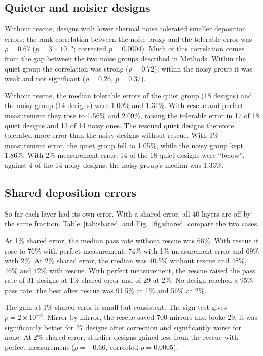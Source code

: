 \subsection{Quieter and noisier designs}

Without rescue, designs with lower thermal noise tolerated smaller deposition errors: the rank correlation between the noise proxy and the tolerable error was $\rho = 0.67$ ($p = 3\times10^{-5}$; corrected $p = 0.0004$). Much of this correlation comes from the gap between the two noise groups described in Methods. Within the quiet group the correlation was strong ($\rho = 0.72$); within the noisy group it was weak and not significant ($\rho = 0.26$, $p = 0.37$).

Without rescue, the median tolerable errors of the quiet group (18 designs) and the noisy group (14 designs) were 1.00\% and 1.31\%. With rescue and perfect measurement they rose to 1.56\% and 2.09\%, raising the tolerable error in 17 of 18 quiet designs and 13 of 14 noisy ones. The rescued quiet designs therefore tolerated more error than the noisy designs without rescue. With 1\% measurement error, the quiet group fell to 1.05\%, while the noisy group kept 1.86\%. With 2\% measurement error, 14 of the 18 quiet designs were ``below'', against 4 of the 14 noisy designs; the noisy group's median was 1.33\%.

\subsection{Shared deposition errors}

So far each layer had its own error. With a shared error, all 40 layers are off by the same fraction. Table~\ref{tab:shared} and Fig.~\ref{fig:shared} compare the two cases.

At 1\% shared error, the median pass rate without rescue was 66\%. With rescue it rose to 76\% with perfect measurement, 74\% with 1\% measurement error and 69\% with 2\%. At 2\% shared error, the median was 40.5\% without rescue and 48\%, 46\% and 42\% with rescue. With perfect measurement, the rescue raised the pass rate of 31 designs at 1\% shared error and of 29 at 2\%. No design reached a 95\% pass rate: the best after rescue was 91.5\% at 1\% and 56\% at 2\%.

The gain at 1\% shared error is small but consistent. The sign test gives $p = 2\times10^{-8}$. Mirror by mirror, the rescue saved 700 mirrors and broke 29; it was significantly better for 27 designs after correction and significantly worse for none. At 2\% shared error, sturdier designs gained less from the rescue with perfect measurement ($\rho = -0.66$, corrected $p = 0.0005$).

